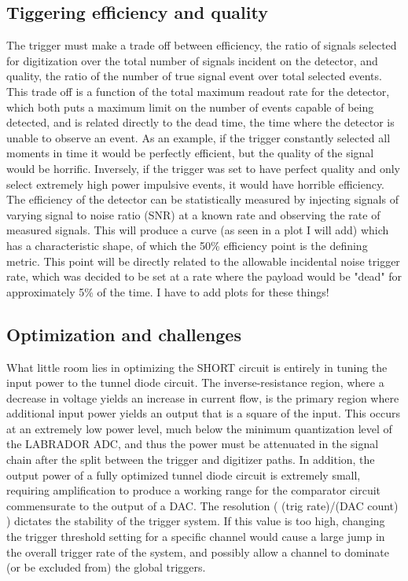 	\subsection{Tiggering efficiency and quality}
		The trigger must make a trade off between efficiency, the ratio of signals selected for digitization over the total number of signals incident on the detector, and quality, the ratio of the number of true signal event over total selected events.  This trade off is a function of the total maximum readout rate for the detector, which both puts a maximum limit on the number of events capable of being detected, and is related directly to the dead time, the time where the detector is unable to observe an event.  As an example, if the trigger constantly selected all moments in time it would be perfectly efficient, but the quality of the signal would be horrific.  Inversely, if the trigger was set to have perfect quality and only select extremely high power impulsive events, it would have horrible efficiency.  The efficiency of the detector can be statistically measured by injecting signals of varying signal to noise ratio (SNR) at a known rate and observing the rate of measured signals.  This will produce a curve (as seen in a plot I will add) which has a characteristic shape, of which the 50\% efficiency point is the defining metric.  This point will be directly related to the allowable incidental noise trigger rate, which was decided to be set at a rate where the payload would be "dead" for approximately 5\% of the time.  I have to add plots for these things!
	\subsection{Optimization and challenges}
		What little room lies in optimizing the SHORT circuit is entirely in tuning the input power to the tunnel diode circuit.  The inverse-resistance region, where a decrease in voltage yields an increase in current flow, is the primary region where additional input power yields an output that is a square of the input.  This occurs at an extremely low power level, much below the minimum quantization level of the LABRADOR ADC, and thus the power must be attenuated in the signal chain after the split between the trigger and digitizer paths.  In addition, the output power of a fully optimized tunnel diode circuit is extremely small,	requiring amplification to produce a working range for the comparator circuit commensurate to the output of a DAC.  The resolution ( (trig rate)/(DAC count) ) dictates the stability of the trigger system.  If this value is too high, changing the trigger threshold setting for a specific channel would cause a large jump in the overall trigger rate of the system, and possibly allow a channel to dominate (or be excluded from) the global triggers.
